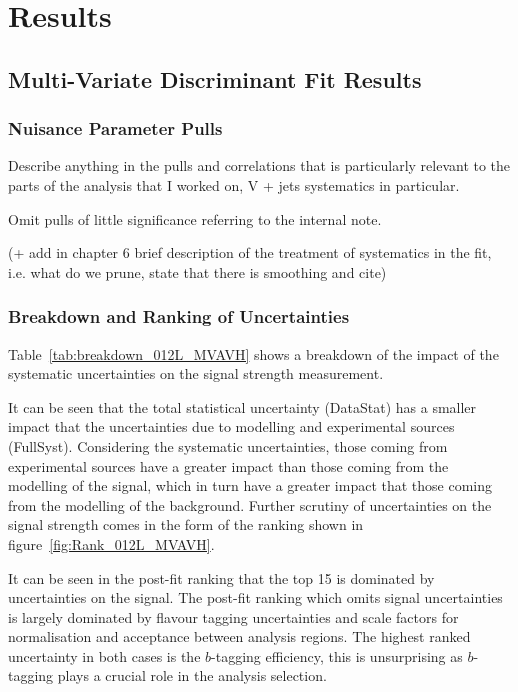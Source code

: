 \chapter{Results}%
\label{ch:results}
\section{\texorpdfstring{\VHbb}{VH->bb} Multi-Variate Discriminant Fit Results}%
\label{sec:mva-results}

\subsection{Nuisance Parameter Pulls}
Describe anything in the pulls and correlations that is particularly relevant to
the parts of the analysis that I worked on, V + jets systematics in particular.

Omit pulls of little significance referring to the internal note.

(+ add in chapter 6 brief description of the treatment of systematics in the
fit, i.e. what do we prune, state that there is smoothing and cite)


\subsection{Breakdown and Ranking of Uncertainties}
Table~\ref{tab:breakdown_012L_MVAVH} shows a breakdown of the impact of the
systematic uncertainties on the signal strength measurement.

It can be seen that the total statistical uncertainty (DataStat) has a smaller
impact that the uncertainties due to modelling and experimental sources
(FullSyst). Considering the systematic uncertainties, those coming from
experimental sources have a greater impact than those coming from the modelling
of the signal, which in turn have a greater impact  that those coming from the
modelling of the background. Further scrutiny of uncertainties on the signal
strength comes in the form of the ranking shown in
figure~\ref{fig:Rank_012L_MVAVH}.

It can be seen in the post-fit ranking that the top 15 is dominated by
uncertainties on the signal. The post-fit ranking which omits signal
uncertainties is largely dominated by flavour tagging uncertainties and scale
factors for normalisation and acceptance between analysis regions. The highest
ranked uncertainty in both cases is the $b$-tagging efficiency, this is
unsurprising as $b$-tagging plays a crucial role in the analysis selection.

